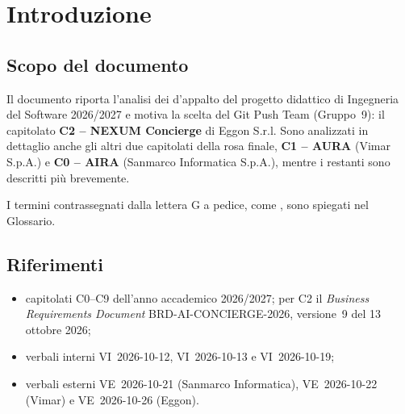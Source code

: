 
\section{Introduzione}

\subsection{Scopo del documento}
Il documento riporta l'analisi dei  d'appalto del
progetto didattico di Ingegneria del Software 2026/2027 e motiva la scelta
del Git Push Team (Gruppo~9): il capitolato \textbf{C2 -- NEXUM
Concierge} di Eggon S.r.l. Sono analizzati in dettaglio anche gli altri
due capitolati della rosa finale, \textbf{C1 -- AURA} (Vimar S.p.A.) e
\textbf{C0 -- AIRA} (Sanmarco Informatica S.p.A.), mentre i restanti sono
descritti più brevemente.

I termini contrassegnati dalla lettera G a pedice, come , sono
spiegati nel Glossario.

\subsection{Riferimenti}
\begin{itemize}
  \item capitolati C0--C9 dell'anno accademico 2026/2027; per C2 il
        \emph{Business Requirements Document} BRD-AI-CONCIERGE-2026,
        versione~9 del 13 ottobre 2026;
  \item verbali interni VI~2026-10-12, VI~2026-10-13 e VI~2026-10-19;
  \item verbali esterni VE~2026-10-21 (Sanmarco Informatica),
        VE~2026-10-22 (Vimar) e VE~2026-10-26 (Eggon).
\end{itemize}
